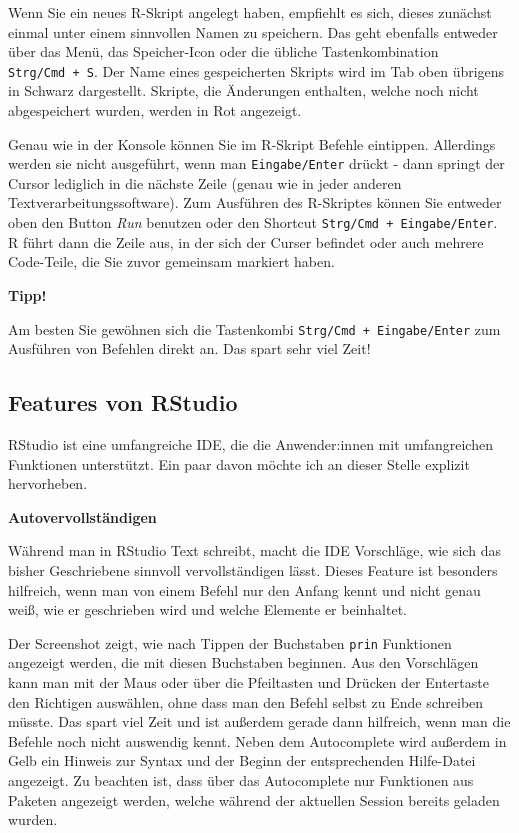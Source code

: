 \documentclass[
]{book}
\begin{document}
Wenn Sie ein neues R-Skript angelegt haben, empfiehlt es sich, dieses zunächst einmal unter einem sinnvollen Namen zu speichern. Das geht ebenfalls entweder über das Menü, das Speicher-Icon oder die übliche Tastenkombination \texttt{Strg/Cmd\ +\ S}. Der Name eines gespeicherten Skripts wird im Tab oben übrigens in Schwarz dargestellt. Skripte, die Änderungen enthalten, welche noch nicht abgespeichert wurden, werden in Rot angezeigt.

Genau wie in der Konsole können Sie im R-Skript Befehle eintippen. Allerdings werden sie nicht ausgeführt, wenn man \texttt{Eingabe/Enter} drückt - dann springt der Cursor lediglich in die nächste Zeile (genau wie in jeder anderen Textverarbeitungssoftware). Zum Ausführen des R-Skriptes können Sie entweder oben den Button \emph{Run} benutzen oder den Shortcut \texttt{Strg/Cmd\ +\ Eingabe/Enter}. R führt dann die Zeile aus, in der sich der Curser befindet oder auch mehrere Code-Teile, die Sie zuvor gemeinsam markiert haben.

\leavevmode\hypertarget{hint_short_cut}{}%
\textbf{Tipp!}

Am besten Sie gewöhnen sich die Tastenkombi \texttt{Strg/Cmd\ +\ Eingabe/Enter} zum Ausführen von Befehlen direkt an. Das spart sehr viel Zeit!

\hypertarget{features-von-rstudio}{%
\subsection{Features von RStudio}\label{features-von-rstudio}}

RStudio ist eine umfangreiche IDE, die die Anwender:innen mit umfangreichen Funktionen unterstützt. Ein paar davon möchte ich an dieser Stelle explizit hervorheben.

\textbf{Autovervollständigen}

Während man in RStudio Text schreibt, macht die IDE Vorschläge, wie sich das bisher Geschriebene sinnvoll vervollständigen lässt. Dieses Feature ist besonders hilfreich, wenn man von einem Befehl nur den Anfang kennt und nicht genau weiß, wie er geschrieben wird und welche Elemente er beinhaltet.

Der Screenshot zeigt, wie nach Tippen der Buchstaben \texttt{prin} Funktionen angezeigt werden, die mit diesen Buchstaben beginnen. Aus den Vorschlägen kann man mit der Maus oder über die Pfeiltasten und Drücken der Entertaste den Richtigen auswählen, ohne dass man den Befehl selbst zu Ende schreiben müsste. Das spart viel Zeit und ist außerdem gerade dann hilfreich, wenn man die Befehle noch nicht auswendig kennt. Neben dem Autocomplete wird außerdem in Gelb ein Hinweis zur Syntax und der Beginn der entsprechenden Hilfe-Datei angezeigt. Zu beachten ist, dass über das Autocomplete nur Funktionen aus Paketen angezeigt werden, welche während der aktuellen Session bereits geladen wurden.
\end{document}
